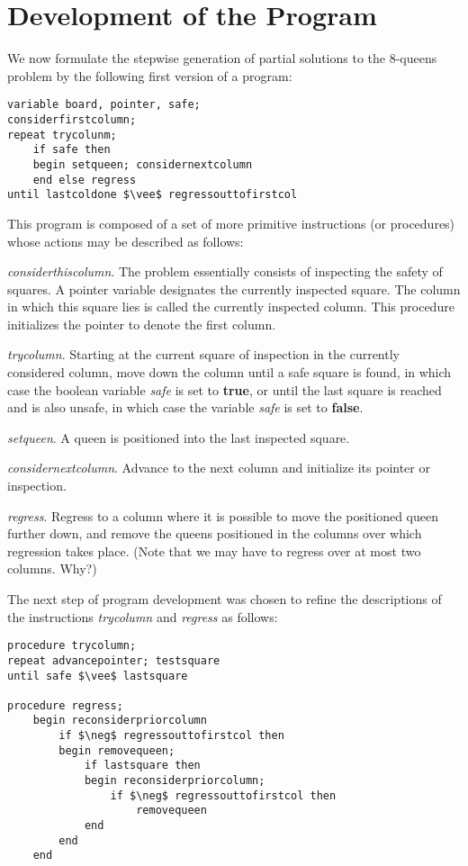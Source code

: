 \section{Development of the Program}

We now formulate the stepwise generation of partial solutions to the 8-queens
problem by the following first version of a program:

\begin{lstlisting}
variable board, pointer, safe;
considerfirstcolumn;
repeat trycolunm;
    if safe then
    begin setqueen; considernextcolumn
    end else regress
until lastcoldone $\vee$ regressouttofirstcol
\end{lstlisting}

This program is composed of a set of more primitive instructions (or
procedures) whose actions may be described as follows:

\begin{small}
\emph{considerthiscolumn}.  The problem essentially consists of inspecting the
safety of squares.  A pointer variable designates the currently inspected
square.  The column in which this square lies is called the currently inspected
column.  This procedure initializes the pointer to denote the first column.

\emph{trycolumn}.  Starting at the current square of inspection in the
currently considered column, move down the column until a safe square is found,
in which case the boolean variable \emph{safe} is set to \textbf{true}, or
until the last square is reached and is also unsafe, in which case the variable
\emph{safe} is set to \textbf{false}.

\emph{setqueen}.  A queen is positioned into the last inspected square.

\emph{considernextcolumn}.  Advance to the next column and initialize its
pointer or inspection.

\emph{regress}.  Regress to a column where it is possible to move the
positioned queen further down, and remove the queens positioned in the columns
over which regression takes place.  (Note that we may have to regress over at
most two columns. Why?)
\end{small}
\vspace{5mm}

The next step of program development was chosen to refine the descriptions of
the instructions \emph{trycolumn} and \emph{regress} as follows:

\begin{lstlisting}
procedure trycolumn;
repeat advancepointer; testsquare
until safe $\vee$ lastsquare

procedure regress;
    begin reconsiderpriorcolumn
        if $\neg$ regressouttofirstcol then
        begin removequeen;
            if lastsquare then
            begin reconsiderpriorcolumn;
                if $\neg$ regressouttofirstcol then
                    removequeen
            end
        end
    end
\end{lstlisting}

